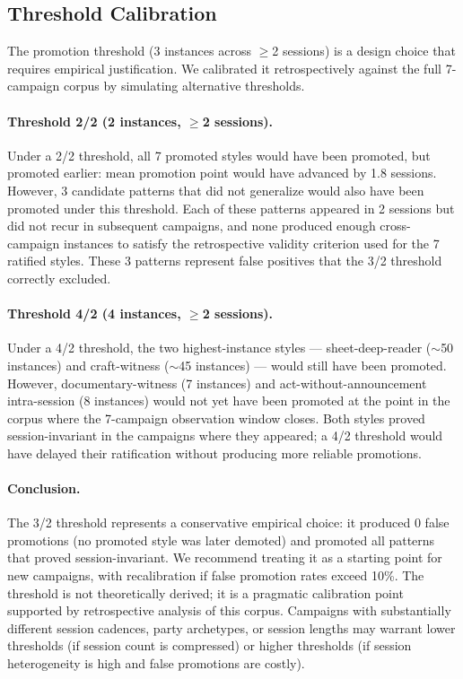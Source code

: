 \subsection{Threshold Calibration}

The promotion threshold (3 instances across $\geq$2 sessions) is a design choice
that requires empirical justification. We calibrated it retrospectively against the
full 7-campaign corpus by simulating alternative thresholds.

\paragraph{Threshold 2/2 (2 instances, $\geq$2 sessions).}
Under a 2/2 threshold, all 7 promoted styles would have been promoted, but promoted
earlier: mean promotion point would have advanced by 1.8 sessions. However, 3
candidate patterns that did not generalize would also have been promoted under this
threshold. Each of these patterns appeared in 2 sessions but did not recur in
subsequent campaigns, and none produced enough cross-campaign instances to satisfy
the retrospective validity criterion used for the 7 ratified styles. These 3 patterns
represent false positives that the 3/2 threshold correctly excluded.

\paragraph{Threshold 4/2 (4 instances, $\geq$2 sessions).}
Under a 4/2 threshold, the two highest-instance styles --- sheet-deep-reader
($\sim$50 instances) and craft-witness ($\sim$45 instances) --- would still have
been promoted. However, documentary-witness (7 instances) and act-without-announcement
intra-session (8 instances) would not yet have been promoted at the point in the
corpus where the 7-campaign observation window closes. Both styles proved
session-invariant in the campaigns where they appeared; a 4/2 threshold would have
delayed their ratification without producing more reliable promotions.

\paragraph{Conclusion.}
The 3/2 threshold represents a conservative empirical choice: it produced 0 false
promotions (no promoted style was later demoted) and promoted all patterns that proved
session-invariant. We recommend treating it as a starting point for new campaigns,
with recalibration if false promotion rates exceed 10\%. The threshold is not
theoretically derived; it is a pragmatic calibration point supported by retrospective
analysis of this corpus. Campaigns with substantially different session cadences,
party archetypes, or session lengths may warrant lower thresholds (if session count
is compressed) or higher thresholds (if session heterogeneity is high and false
promotions are costly).

